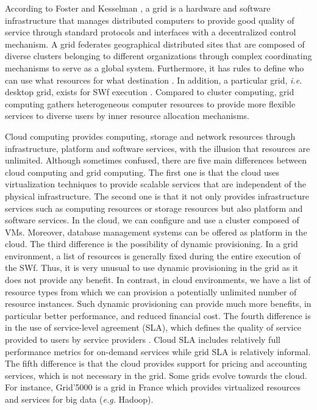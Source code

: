 According to Foster and Kesselman \cite{Foster2003}, a grid
is a hardware and software infrastructure that manages distributed computers to provide good quality of service through standard protocols and interfaces with a decentralized control mechanism. A grid federates geographical distributed sites that are composed of
diverse clusters  belonging to different organizations through complex coordinating mechanisms to serve as a global system. Furthermore, it has rules to define who can use what resources for what destination \cite{Foster2003}.
In addition, a particular grid, \textit{i.e.} desktop grid, exists for SWf execution \cite{Reynolds2011}.
Compared to cluster computing, grid computing gathers heterogeneous computer resources to provide more flexible services to diverse users by inner resource allocation mechanisms.

Cloud computing provides computing, storage and network resources through infrastructure, platform and software services, with the illusion that resources are unlimited. Although sometimes confused, there are five main differences between cloud computing and grid computing. The first one is that the cloud uses virtualization techniques to provide scalable services that are independent of the
physical infrastructure. The second one is that it not
only provides infrastructure services such as computing resources or storage resources but also platform and software services. In the cloud, we can configure and use a cluster composed of VMs. Moreover, database management systems can be offered as platform in the cloud. The third difference is the possibility of dynamic provisioning. In a grid environment, a list of resources is generally fixed during the entire execution of the SWf. Thus, it is very unusual to use dynamic provisioning in the grid as it does not provide any benefit. In contrast, in cloud environments, we have a list of resource types from which we can provision a potentially unlimited number of resource instances. Such dynamic provisioning can provide much more benefits, in particular better performance, and reduced financial cost. The fourth difference is in the use of service-level agreement (SLA), which defines the quality of service provided to users by service providers \cite{Wieder2011}. Cloud SLA includes relatively full performance metrics for on-demand services \cite{Brandic2011} while grid SLA is relatively informal. The fifth difference is that the cloud provides support for pricing and accounting services, which is not necessary in the grid. Some grids evolve towards the cloud. For instance,
Grid'5000 \cite{grid5000} is a grid in France which provides
virtualized resources and services for big data (\textit{e.g.} Hadoop).

